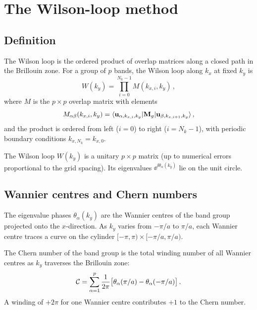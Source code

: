 \section{The Wilson-loop method}
\label{sec:ch10-wilson}

\subsection{Definition}
\label{sec:ch10-wilson-def}

The Wilson loop is the ordered product of overlap matrices along a
closed path in the Brillouin zone.  For a group of $p$ bands, the
Wilson loop along $k_x$ at fixed $k_y$ is
\begin{equation}\label{eq:ch10-wilson-def}
  W(k_y) = \prod_{i=0}^{N_k-1}M(k_{x,i},k_y)\,,
\end{equation}
where $M$ is the $p\times p$ overlap matrix with elements
\begin{equation}\label{eq:ch10-wilson-M}
  M_{\alpha\beta}(k_{x,i},k_y)
  = \langle\mathbf{u}_{\alpha,k_{x,i},k_y}|\mathbf{M}_g|
  \mathbf{u}_{\beta,k_{x,i+1},k_y}\rangle\,,
\end{equation}
and the product is ordered from left ($i=0$) to right ($i=N_k-1$),
with periodic boundary conditions $k_{x,N_k}=k_{x,0}$.

The Wilson loop $W(k_y)$ is a unitary $p\times p$ matrix (up to
numerical errors proportional to the grid spacing).  Its eigenvalues
$\ee^{\ii\theta_\alpha(k_y)}$ lie on the unit circle.

\subsection{Wannier centres and Chern numbers}
\label{sec:ch10-wannier}

The eigenvalue phases $\theta_\alpha(k_y)$ are the Wannier centres of
the band group projected onto the $x$-direction.  As $k_y$ varies
from $-\pi/a$ to $\pi/a$, each Wannier centre traces a curve on the
cylinder $[-\pi,\pi)\times[-\pi/a,\pi/a)$.

The Chern number of the band group is the total winding number of
all Wannier centres as $k_y$ traverses the Brillouin zone:
\begin{equation}\label{eq:ch10-chern-winding}
  \mathcal{C} = \sum_{\alpha=1}^p\frac{1}{2\pi}
  \bigl[\theta_\alpha(\pi/a)-\theta_\alpha(-\pi/a)\bigr]\,.
\end{equation}
A winding of $+2\pi$ for one Wannier centre contributes $+1$ to the
Chern number.

